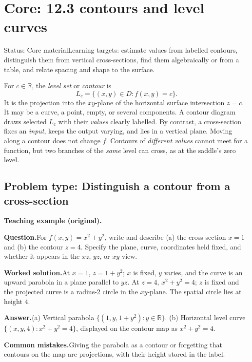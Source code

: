 \documentclass[11pt,letterpaper]{article}
\newcommand{\problem}[1]{\subsection{Problem type: #1}}
\newcommand{\teach}{\textbf{Teaching example (original).}\quad}
\newcommand{\question}{\par\textbf{Question.}\quad}
\newcommand{\solution}{\par\textbf{Worked solution.}\quad}
\newcommand{\answer}{\par\textbf{Answer.}\quad}
\newcommand{\mistake}{\par\textbf{Common mistakes.}\quad}
\newcommand{\R}{\mathbb R}
\begin{document}
\section{Core: 12.3 contours and level curves}\label{contour}
\begin{statusbox}{Status: Core material}Learning targets: estimate values from labelled contours, distinguish them from vertical cross-sections, find them algebraically or from a table, and relate spacing and shape to the surface.\end{statusbox}
For $c\in\R$, the \emph{level set} or \emph{contour} is
\[L_c=\{(x,y)\in D:f(x,y)=c\}.\]
It is the projection into the $xy$-plane of the horizontal surface intersection $z=c$. It may be a curve, a point, empty, or several components. A contour diagram draws selected $L_c$ with their \emph{values} clearly labelled. By contrast, a cross-section fixes an \emph{input}, keeps the output varying, and lies in a vertical plane. Moving along a contour does not change $f$. Contours of \emph{different values} cannot meet for a function, but two branches of the \emph{same} level can cross, as at the saddle's zero level.

\problem{Distinguish a contour from a cross-section}
\teach\question For $f(x,y)=x^2+y^2$, write and describe (a) the cross-section $x=1$ and (b) the contour $z=4$. Specify the plane, curve, coordinates held fixed, and whether it appears in the $xz$, $yz$, or $xy$ view.
\solution At $x=1$, $z=1+y^2$; $x$ is fixed, $y$ varies, and the curve is an upward parabola in a plane parallel to $yz$. At $z=4$, $x^2+y^2=4$; $z$ is fixed and the projected curve is a radius-2 circle in the $xy$-plane. The spatial circle lies at height $4$.
\answer (a) Vertical parabola $\{(1,y,1+y^2):y\in\R\}$. (b) Horizontal level curve $\{(x,y,4):x^2+y^2=4\}$, displayed on the contour map as $x^2+y^2=4$.
\mistake Giving the parabola as a contour or forgetting that contours on the map are projections, with their height stored in the label.
\end{document}
